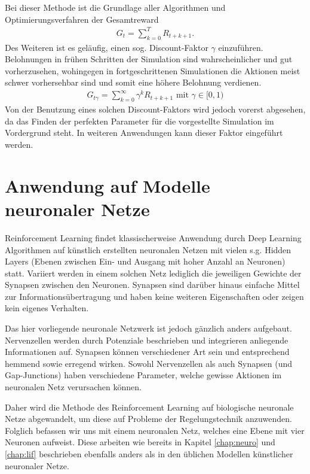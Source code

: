 	Bei dieser Methode ist die Grundlage aller Algorithmen und Optimierungsverfahren der Gesamtreward
	\begin{align}
		G_t = \sum_{k=0}^{T}R_{t+k+1}.
	\end{align}
	Des Weiteren ist es geläufig, einen sog. \glqq Discount-Faktor\grqq{} $\gamma$ einzuführen. Belohnungen in frühen Schritten der Simulation sind wahrscheinlicher und gut vorherzusehen, wohingegen in fortgeschrittenen Simulationen die Aktionen meist schwer vorhersehbar sind und somit eine höhere Belohnung verdienen.
	\begin{align}
		G_{t\gamma} = \sum_{k=0}^{\infty}\gamma^k R_{t+k+1}\text{ mit }\gamma\in[0,1)
	\end{align}
	Von der Benutzung eines solchen Discount-Faktors wird jedoch vorerst abgesehen, da das Finden der perfekten Parameter für die vorgestellte Simulation im Vordergrund steht. In weiteren Anwendungen kann dieser Faktor eingeführt werden.
	
\section{Anwendung auf Modelle neuronaler Netze}
\label{sec:rl_neuro}
	Reinforcement Learning findet klassischerweise Anwendung durch Deep Learning Algorithmen auf künstlich erstellten neuronalen Netzen mit vielen s.g. \glqq Hidden Layers\grqq{} (Ebenen zwischen Ein- und Ausgang mit hoher Anzahl an Neuronen) statt. Variiert werden in einem solchen Netz lediglich die jeweiligen Gewichte der Synapsen zwischen den Neuronen. Synapsen sind darüber hinaus einfache Mittel zur Informationsübertragung und haben keine weiteren Eigenschaften oder zeigen kein eigenes Verhalten.
	
	Das hier vorliegende neuronale Netzwerk ist jedoch gänzlich anders aufgebaut. Nervenzellen werden durch Potenziale beschrieben und integrieren anliegende Informationen auf. Synapsen können verschiedener Art sein und entsprechend hemmend sowie erregend wirken. Sowohl Nervenzellen als auch Synapsen (und Gap-Junctions) haben verschiedene Parameter, welche gewisse Aktionen im neuronalen Netz verursachen können.
	
	Daher wird die Methode des Reinforcement Learning auf biologische neuronale Netze abgewandelt, um diese auf Probleme der Regelungstechnik anzuwenden. Folglich befassen wir uns mit einem neuronalen Netz, welches eine Ebene mit vier Neuronen aufweist. Diese  arbeiten wie bereits in Kapitel \ref{chap:neuro} und \ref{chap:lif} beschrieben ebenfalls anders als in den üblichen Modellen künstlicher neuronaler Netze.
	
